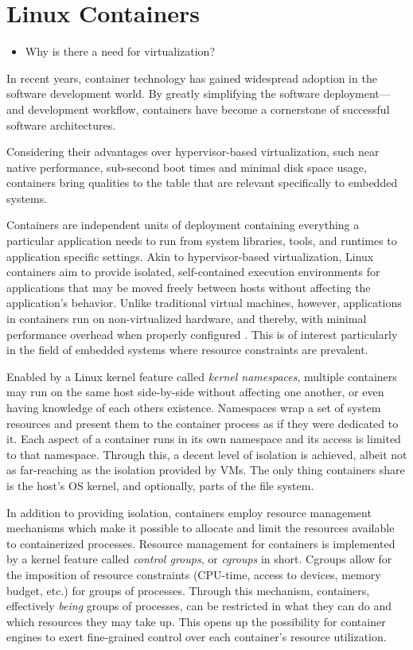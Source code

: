 
\section{Linux Containers}

\begin{itemize}
	\item Why is there a need for virtualization?
\end{itemize}

In recent years, container technology has gained widespread adoption in the software development world. By greatly simplifying the software deployment— and development workflow, containers have become a cornerstone of successful software architectures.


Considering their advantages over hypervisor-based virtualization, such near native performance, sub-second boot times \cite{felter2015updated,morabito2015hypervisors} and minimal disk space usage, containers bring qualities to the table that are relevant specifically to embedded systems.

Containers are independent units of deployment containing everything a particular application needs to run from system libraries, tools, and runtimes to application specific settings. 
Akin to hypervisor-based virtualization, Linux containers aim to provide isolated, self-contained execution environments for applications that may be moved freely between hosts without affecting the application's behavior.
Unlike traditional virtual machines, however, applications in containers run on non-virtualized hardware, and thereby, with minimal performance overhead when properly configured \cite{felter2015updated,morabito2015hypervisors}. This is of interest particularly in the field of embedded systems where resource constraints are prevalent.

Enabled by a Linux kernel feature called \emph{kernel namespaces}, multiple containers may run on the same host side-by-side without affecting one another, or even having knowledge of each others existence. 
Namespaces wrap a set of system resources and present them to the container process as if they were dedicated to it. Each aspect of a container runs in its own namespace and its access is limited to that namespace. Through this, a decent level of isolation is achieved, albeit not as far-reaching as the isolation provided by VMs. The only thing containers share is the host's OS kernel, and optionally, parts of the file system.

In addition to providing isolation, containers employ resource management mechanisms which make it possible to allocate and limit the resources available to containerized processes. Resource management for containers is implemented by a kernel feature called \emph{control groups}, or \emph{cgroups} in short. Cgroups allow for the imposition of resource constraints (CPU-time, access to devices, memory budget, etc.) for groups of processes. Through this mechanism, containers, effectively \emph{being} groups of processes, can be restricted in what they can do and which resources they may take up. This opens up the possibility for container engines to exert fine-grained control over each container's resource utilization.


